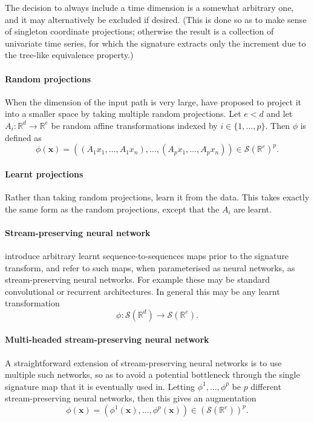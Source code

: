 \documentclass{article}
\theoremstyle{definition}
\theoremstyle{remark}
\newcommand{\reals}{\mathbb{R}}
\newcommand{\tseries}[1]{\mathcal{S}(#1)}
\begin{document}
	The decision to always include a time dimension is a somewhat arbitrary one, and it may alternatively be excluded if desired. (This is done so as to make sense of singleton coordinate projections; otherwise the result is a collection of univariate time series, for which the signature extracts only the increment due to the tree-like equivalence property.)
	
	\paragraph{Random projections}
	When the dimension of the input path is very large, \citet{lyons2017sketching} have proposed to project it into a smaller space by taking multiple random projections. Let $e<d$ and let $A_i:\reals^d \to \reals^{e}$ be random affine transformations indexed by $i \in \{1, \ldots, p\}$. Then $\phi$ is defined as
	\begin{equation*}
	\phi(\mathbf{x})= ((A_1 x_1,\dots,A_1 x_n), \ldots, (A_p x_1,\dots,A_p x_n)) \in \tseries{\reals^{e}}^p.
	\end{equation*}
	
	\paragraph{Learnt projections}
	Rather than taking random projections, \citet{logsig-rnn} learn it from the data. This takes exactly the same form as the random projections, except that the $A_i$ are learnt.
	
	\paragraph{Stream-preserving neural network}
	\citet{kidger2019deep} introduce arbitrary learnt sequence-to-sequences maps prior to the signature transform, and refer to such maps, when parameterised as neural networks, as stream-preserving neural networks. For example these may be standard convolutional or recurrent architectures. In general this may be any learnt transformation
	\begin{equation*}
	\phi \colon \tseries{\reals^d} \to \tseries{\reals^e}.
	\end{equation*}

	\paragraph{Multi-headed stream-preserving neural network}
	A straightforward extension of stream-preserving neural networks is to use multiple such networks, so as to avoid a potential bottleneck through the single signature map that it is eventually used in. Letting $\phi^1, \ldots, \phi^p$ be $p$ different stream-preserving neural networks, then this gives an augmentation
	\begin{equation*}
	\phi(\mathbf{x}) = (\phi^1(\mathbf{x}), \ldots, \phi^p(\mathbf{x})) \in (\tseries{\reals^e})^p.
	\end{equation*}
\end{document}
